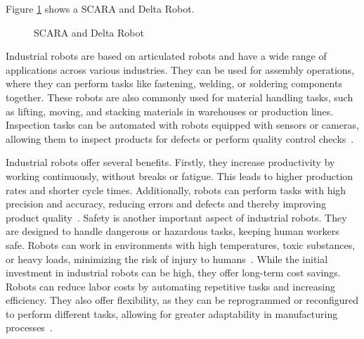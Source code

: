 Figure \ref{fig:ScaraDelta} shows a SCARA and Delta Robot.
\begin{figure}[H]%
	\centering
	\qquad
	\caption{SCARA and Delta Robot}%
	\label{fig:ScaraDelta}%
\end{figure}

Industrial robots are based on articulated robots and have a wide range of applications across various industries. They can be used for assembly operations, where they can perform tasks like fastening, welding, or soldering components together. These robots are also commonly used for material handling tasks, such as lifting, moving, and stacking materials in warehouses or production lines. Inspection tasks can be automated with robots equipped with sensors or cameras, allowing them to inspect products for defects or perform quality control checks~\cite{Hagele.2016}.


Industrial robots offer several benefits. Firstly, they increase productivity by working continuously, without breaks or fatigue. This leads to higher production rates and shorter cycle times. Additionally, robots can perform tasks with high precision and accuracy, reducing errors and defects and thereby improving product quality~\cite{Kubela.2016}. Safety is another important aspect of industrial robots. They are designed to handle dangerous or hazardous tasks, keeping human workers safe. Robots can work in environments with high temperatures, toxic substances, or heavy loads, minimizing the risk of injury to humans~\cite{Heyer.2010}.
While the initial investment in industrial robots can be high, they offer long-term cost savings. Robots can reduce labor costs by automating repetitive tasks and increasing efficiency. They also offer flexibility, as they can be reprogrammed or reconfigured to perform different tasks, allowing for greater adaptability in manufacturing processes~\cite{Jung.2020b}.

